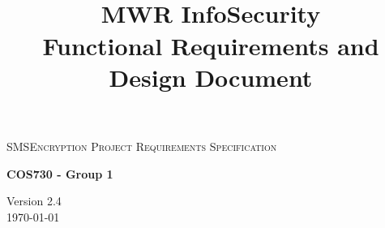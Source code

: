 \begin{titlepage}
\begin{center}

\textsc{\LARGE SMSEncryption Project Requirements Specification}

\textbf{COS730 - Group 1} \\

\title{
  \textbf{\\}
MWR InfoSecurity\\
Functional Requirements and Design Document\\
}

\vfill

{\large Version 2.4}
\\
{\large \today}

\end{center}
\end{titlepage}
